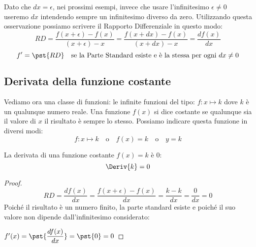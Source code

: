 Dato che \(dx = \epsilon\), nei prossimi esempi, invece che usare 
l'infinitesimo \(\epsilon \neq 0\) useremo \(dx\) intendendo sempre un 
infinitesimo diverso da zero.
Utilizzando questa osservazione possiamo scrivere il 
Rapporto Differenziale in questo modo: 
\[RD = \dfrac{f(x +\epsilon) -f(x)}{(x +\epsilon) -x} = 
       \dfrac{f(x +dx) -f(x)}{(x +dx) -x} = 
       \dfrac{df(x)}{dx} \]
\[f' = \pst{RD} \quad 
\text{se la Parte Standard esiste e è la stessa per ogni } dx \ne 0\]

\subsection{Derivata della funzione costante}
\label{subsec:differenziazione_derivatafcostante}

Vediamo ora una classe di funzioni: le infinite funzioni del tipo: 
\(f: x \mapsto k\) dove \(k\) è un qualunque numero reale.
Una funzione \(f(x)\) si dice costante se qualunque sia il valore di 
\(x\) il risultato è sempre lo stesso. 
Possiamo indicare questa funzione in diversi modi:
\[f: x \mapsto k \quad \text{o} \quad f(x)=k \quad \text{o} \quad y = k\]

\begin{teorema}
La derivata di una funzione costante \(f(x) = k\) \quad è \quad \(0\):
\[\Deriv{k}=0\]
\end{teorema}
\begin{proof}
\[RD = \dfrac{df(x)}{dx} = \dfrac{f(x +\epsilon) -f(x)}{dx} =
  \dfrac{k-k}{dx} = \dfrac{0}{dx} = 0\]
Poiché il risultato è un numero finito, la parte standard esiste e 
poiché il suo valore non dipende dall'infinitesimo considerato:

\hspace{45mm} \(f'(x) = \pst{\dfrac{df(x)}{dx}} = \pst{0} = 0\)
\end{proof}


% 

